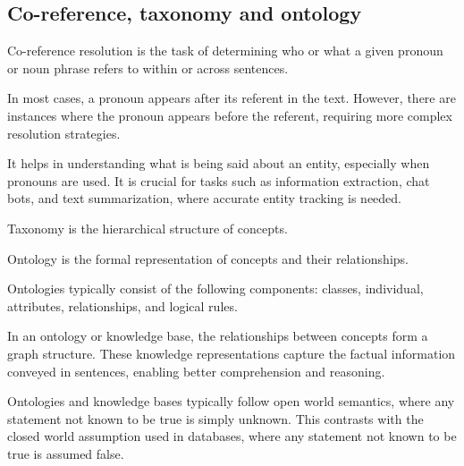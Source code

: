 \subsection{Co-reference, taxonomy and ontology}
\begin{definition}
    Co-reference resolution is the task of determining who or what a given pronoun or noun phrase refers to within or across sentences.
\end{definition}
\noindent In most cases, a pronoun appears after its referent in the text.
However, there are instances where the pronoun appears before the referent, requiring more complex resolution strategies.

It helps in understanding what is being said about an entity, especially when pronouns are used.
It is crucial for tasks such as information extraction, chat bots, and text summarization, where accurate entity tracking is needed.

\begin{definition}
    Taxonomy is the hierarchical structure of concepts. 
\end{definition}
\begin{definition}
    Ontology is the formal representation of concepts and their relationships.
\end{definition}
Ontologies typically consist of the following components: classes, individual, attributes, relationships, and logical rules. 

In an ontology or knowledge base, the relationships between concepts form a graph structure. 
These knowledge representations capture the factual information conveyed in sentences, enabling better comprehension and reasoning.

Ontologies and knowledge bases typically follow open world semantics, where any statement not known to be true is simply unknown. 
This contrasts with the closed world assumption used in databases, where any statement not known to be true is assumed false.